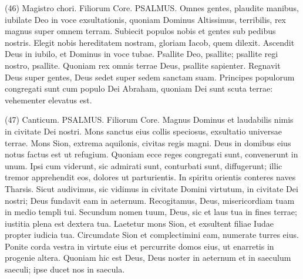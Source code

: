 \begin{biblechapter}  (46) 
\verse  Magistro chori. Filiorum Core. PSALMUS. 
\verse Omnes gentes, plaudite manibus, iubilate Deo in voce exsultationis, 
\verse quoniam Dominus Altissimus, terribilis, rex magnus super omnem terram. 
\verse Subiecit populos nobis et gentes sub pedibus nostris. 
\verse Elegit nobis hereditatem nostram, gloriam Iacob, quem dilexit. 
\verse Ascendit Deus in iubilo, et Dominus in voce tubae. 
\verse Psallite Deo, psallite; psallite regi nostro, psallite. 
\verse Quoniam rex omnis terrae Deus, psallite sapienter. 
\verse Regnavit Deus super gentes, Deus sedet super sedem sanctam suam. 
\verse Principes populorum congregati sunt cum populo Dei Abraham, quoniam Dei sunt scuta terrae: vehementer elevatus est. 
\end{biblechapter}

\begin{biblechapter}  (47) 
\verse  Canticum. PSALMUS. Filiorum Core. 
\verse Magnus Dominus et laudabilis nimis in civitate Dei nostri. 
\verse Mons sanctus eius collis speciosus, exsultatio universae terrae. Mons Sion, extrema aquilonis, civitas regis magni. 
\verse Deus in domibus eius notus factus est ut refugium. 
\verse Quoniam ecce reges congregati sunt, convenerunt in unum. 
\verse Ipsi cum viderunt, sic admirati sunt, conturbati sunt, diffugerunt; 
\verse illic tremor apprehendit eos, dolores ut parturientis. 
\verse In spiritu orientis conteres naves Tharsis. 
\verse Sicut audivimus, sic vidimus in civitate Domini virtutum, in civitate Dei nostri; Deus fundavit eam in aeternum. 
\verse Recogitamus, Deus, misericordiam tuam in medio templi tui. 
\verse Secundum nomen tuum, Deus, sic et laus tua in fines terrae; iustitia plena est dextera tua. 
\verse Laetetur mons Sion, et exsultent filiae Iudae propter iudicia tua. 
\verse Circumdate Sion et complectimini eam, numerate turres eius. 
\verse Ponite corda vestra in virtute eius et percurrite domos eius, ut enarretis in progenie altera. 
\verse Quoniam hic est Deus, Deus noster in aeternum et in saeculum saeculi; ipse ducet nos in saecula. 
\end{biblechapter}

